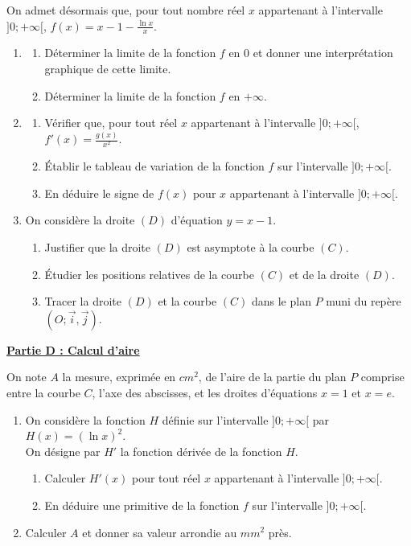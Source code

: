\documentclass[12pt,a4paper]{article}
\begin{document}
On admet désormais que, pour tout nombre réel $x$ appartenant à l'intervalle $]0; +\infty[$, $f(x) = x - 1 - \frac{\ln x}{x}$.
\begin{enumerate}
    \item 
    \begin{enumerate}
        \item Déterminer la limite de la fonction $f$ en $0$ et donner une interprétation graphique de cette limite.
        \item Déterminer la limite de la fonction $f$ en $+\infty$.
    \end{enumerate}
    \item 
    \begin{enumerate}
        \item Vérifier que, pour tout réel $x$ appartenant à l'intervalle $]0; +\infty[$, $f'(x) = \frac{g(x)}{x^2}$.
        \item Établir le tableau de variation de la fonction $f$ sur l'intervalle $]0; +\infty[$.
        \item En déduire le signe de $f(x)$ pour $x$ appartenant à l'intervalle $]0; +\infty[$.
    \end{enumerate}
    \item On considère la droite $(D)$ d'équation $y = x - 1$.
    \begin{enumerate}
        \item Justifier que la droite $(D)$ est asymptote à la courbe $(C)$.
        \item Étudier les positions relatives de la courbe $(C)$ et de la droite $(D)$.
        \item Tracer la droite $(D)$ et la courbe $(C)$ dans le plan $P$ muni du repère $(O; \vec{i}, \vec{j})$.
    \end{enumerate}
\end{enumerate}

\underline{\textbf{Partie D : Calcul d'aire}}

On note $A$ la mesure, exprimée en $cm^2$, de l'aire de la partie du plan $P$ comprise entre la courbe $C$, l'axe des abscisses, et les droites d'équations $x = 1$ et $x = e$.
\begin{enumerate}
    \item On considère la fonction $H$ définie sur l'intervalle $]0; +\infty[$ par $H(x) = (\ln x)^2$. \\
    On désigne par $H'$ la fonction dérivée de la fonction $H$.
    \begin{enumerate}
        \item Calculer $H'(x)$ pour tout réel $x$ appartenant à l'intervalle $]0; +\infty[$.
        \item En déduire une primitive de la fonction $f$ sur l'intervalle $]0; +\infty[$.
    \end{enumerate}
    \item Calculer $A$ et donner sa valeur arrondie au $mm^2$ près.
\end{enumerate}
\end{document}
